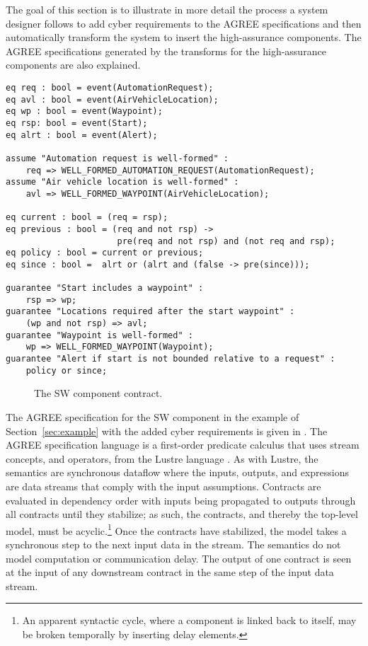 The goal of this section is to illustrate in more detail the process a system designer follows to add cyber requirements to the AGREE specifications and then automatically transform the system to insert the high-assurance components.
The AGREE specifications generated by the transforms for the high-assurance components are also explained.

\newsavebox{\sw}
\begin{lrbox}{\sw}
\begin{lstlisting}[style=agree]
eq req : bool = event(AutomationRequest);
eq avl : bool = event(AirVehicleLocation);
eq wp : bool = event(Waypoint);
eq rsp: bool = event(Start);
eq alrt : bool = event(Alert);

assume "Automation request is well-formed" :
    req => WELL_FORMED_AUTOMATION_REQUEST(AutomationRequest);
assume "Air vehicle location is well-formed" :
    avl => WELL_FORMED_WAYPOINT(AirVehicleLocation);

eq current : bool = (req = rsp);
eq previous : bool = (req and not rsp) ->
                      pre(req and not rsp) and (not req and rsp);
eq policy : bool = current or previous;
eq since : bool =  alrt or (alrt and (false -> pre(since)));

guarantee "Start includes a waypoint" :
    rsp => wp;
guarantee "Locations required after the start waypoint" :
    (wp and not rsp) => avl;
guarantee "Waypoint is well-formed" :
    wp => WELL_FORMED_WAYPOINT(Waypoint);
guarantee "Alert if start is not bounded relative to a request" :
    policy or since;
\end{lstlisting}
\end{lrbox}

\begin{figure}
  \begin{center}
    \scalebox{0.60}{\usebox{\sw}}
  \end{center}
  \caption{The SW component contract.}
  \label{fig:sw}
\end{figure}

The AGREE specification for the SW component in the example of Section~\ref{sec:example} with the added cyber requirements is given in .
The AGREE specification language is a first-order predicate calculus that uses stream concepts, and operators, from the Lustre language \cite{10.1145/41625.41641}.
As with Lustre, the semantics are synchronous dataflow where the inputs, outputs, and expressions are data streams that comply with the input assumptions.
Contracts are evaluated in dependency order with inputs being propagated to outputs through all contracts until they stabilize; as such, the contracts, and thereby the top-level model, must be acyclic.\footnote{An apparent syntactic cycle, where a component is linked back to itself, may be broken temporally by inserting delay elements.}
Once the contracts have stabilized, the model takes a synchronous step to the next input data in the stream.
The semantics do not model computation or communication delay.
The output of one contract is seen at the input of any downstream contract in the same step of the input data stream.


